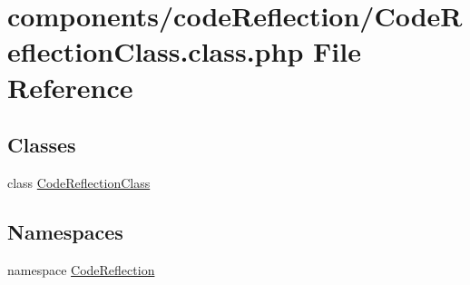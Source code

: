 \hypertarget{_code_reflection_class_8class_8php}{
\section{components/codeReflection/CodeReflectionClass.class.php File Reference}
\label{_code_reflection_class_8class_8php}
}
\subsection*{Classes}
\begin{CompactItemize}
\item 
class \hyperlink{class_code_reflection_class}{CodeReflectionClass}
\end{CompactItemize}
\subsection*{Namespaces}
\begin{CompactItemize}
\item 
namespace \hyperlink{namespace_code_reflection}{CodeReflection}
\end{CompactItemize}

